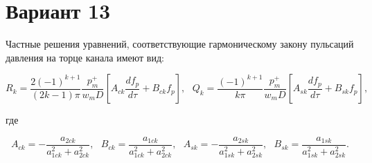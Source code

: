 \documentclass{article}
\begin{document}
\section*{Вариант 13}

Частные решения уравнений, соответствующие гармоническому закону пульсаций давления
на торце канала имеют вид:\

\begin{equation}
    R_k = \frac{2(-1)^{k+1}}{(2k-1) \pi} \frac{p^+_m}{w_mD}\left[A_{ck}\frac{df_p}{d\tau}+B_{ck}f_p\right],~~~
    Q_k = \frac{(-1)^{k+1}}{k \pi} \frac{p^+_m}{w_mD}\left[A_{sk}\frac{df_p}{d\tau}+B_{sk}f_p\right],
\end{equation}

где

\begin{equation*}
    A_{ck}=-\frac{a_{2ck}}{a^2_{1ck}+a^2_{2ck}},~~~
    B_{ck}=\frac{a_{1ck}}{a^2_{1ck}+a^2_{2ck}},~~~
    A_{sk}=-\frac{a_{2sk}}{a^2_{1sk}+a^2_{2sk}},~~~
    B_{sk}=\frac{a_{1sk}}{a^2_{1sk}+a^2_{2sk}}.

\end{equation*}
\end{document}
